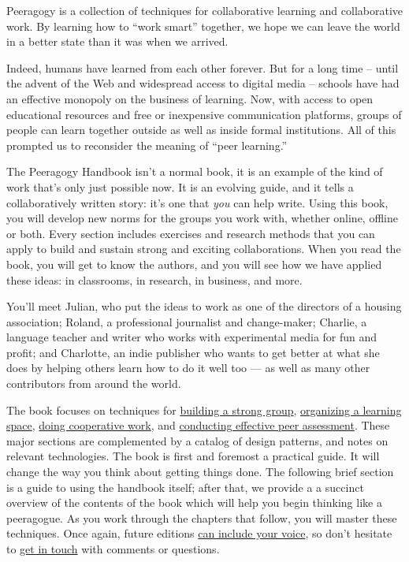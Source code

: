 Peeragogy is a collection of techniques for collaborative learning and
collaborative work. By learning how to ``work smart'' together, we hope
we can leave the world in a better state than it was when we arrived.

Indeed, humans have learned from each other forever. But for a long time
-- until the advent of the Web and widespread access to digital media --
schools have had an effective monopoly on the business of learning. Now,
with access to open educational resources and free or inexpensive
communication platforms, groups of people can learn together outside as
well as inside formal institutions. All of this prompted us to
reconsider the meaning of ``peer learning.''

The Peeragogy Handbook isn't a normal book, it is an example of the kind
of work that's only just possible now. It is an evolving guide, and it
tells a collaboratively written story: it's one that \emph{you} can help
write. Using this book, you will develop new norms for the groups you
work with, whether online, offline or both. Every section includes
exercises and research methods that you can apply to build and sustain
strong and exciting collaborations. When you read the book, you will get
to know the authors, and you will see how we have applied these ideas:
in classrooms, in research, in business, and more.

You'll meet Julian, who put the ideas to work as one of the directors of
a housing association; Roland, a professional journalist and
change-maker; Charlie, a language teacher and writer who works with
experimental media for fun and profit; and Charlotte, an indie publisher
who wants to get better at what she does by helping others learn how to
do it well too --- as well as many other contributors from around the
world.

The book focuses on techniques for
\href{http://peeragogy.org/convene/}{building a strong group},
\href{http://peeragogy.org/organize/}{organizing a learning space},
\href{http://peeragogy.org/cowork/}{doing cooperative work}, and
\href{http://peeragogy.org/assessment/}{conducting effective peer
assessment}. These major sections are complemented by a catalog of
design patterns, and notes on relevant technologies. The book is first
and foremost a practical guide. It will change the way you think about
getting things done. The following brief section is a guide to using the
handbook itself; after that, we provide a a succinct overview of the
contents of the book which will help you begin thinking like a
peeragogue. As you work through the chapters that follow, you will
master these techniques. Once again, future editions
\href{http://peeragogy.org/resources/how-to-get-involved/}{can include
your voice}, so don't hesitate to
\href{http://peeragogy.org/contact/}{get in touch} with comments or
questions.

